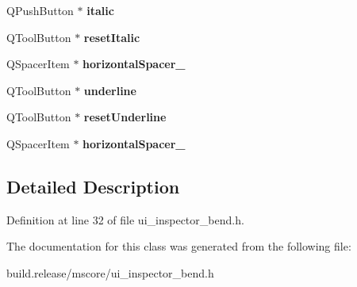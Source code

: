 \begin{DoxyCompactItemize}
Q\+Push\+Button $\ast$ {\bfseries italic}
\item 
\mbox{\label{class_ui___inspector_bend_af64eb268f4d37a66c806a52a2a495b32}} 
Q\+Tool\+Button $\ast$ {\bfseries reset\+Italic}
\item 
\mbox{\label{class_ui___inspector_bend_a9a205b2a89cbb5770486e77e92fa76c8}} 
Q\+Spacer\+Item $\ast$ {\bfseries horizontal\+Spacer\+\_}
\item 
\mbox{\label{class_ui___inspector_bend_a71882ae1c5a68eca70a4838ef899df12}} 
Q\+Tool\+Button $\ast$ {\bfseries underline}
\item 
\mbox{\label{class_ui___inspector_bend_a9a8a7d6cc1cb2792d4875cecdacc60aa}} 
Q\+Tool\+Button $\ast$ {\bfseries reset\+Underline}
\item 
\mbox{\label{class_ui___inspector_bend_a6e2bc3052d0936444f46fdab7ca9b0bf}} 
Q\+Spacer\+Item $\ast$ {\bfseries horizontal\+Spacer\+\_}
\end{DoxyCompactItemize}


\subsection{Detailed Description}


Definition at line 32 of file ui\+\_\+inspector\+\_\+bend.\+h.



The documentation for this class was generated from the following file\+:\begin{DoxyCompactItemize}
\item 
build.\+release/mscore/ui\+\_\+inspector\+\_\+bend.\+h\end{DoxyCompactItemize}
